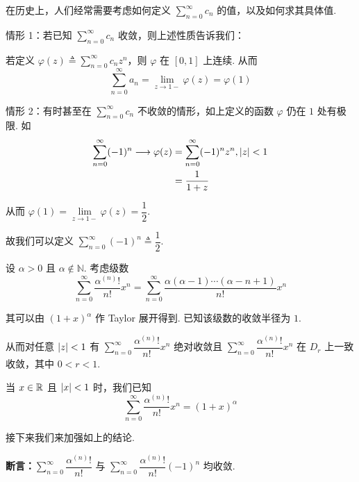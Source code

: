 \begin{example}[ Abel 求和]
    在历史上，人们经常需要考虑如何定义 $\sum\limits_{n=0}^\infty c_n$ 的值，以及如何求其具体值.

    情形 1：若已知 $\sum\limits_{n=0}^\infty c_n$ 收敛，则上述性质告诉我们：

    若定义 $\varphi(z)\triangleq\sum\limits_{n=0}^\infty c_nz^n$，则 $\varphi$ 在 $[0,1]$ 上连续. 从而
$$
\sum_{n=0}^\infty a_n=\lim_{z\to 1-}\varphi(z)=\varphi(1)
$$

    情形 2：有时甚至在 $\sum\limits_{n=0}^\infty c_n$ 不收敛的情形，如上定义的函数 $\varphi$ 仍在 $1$ 处有极限. 如
$$
\begin{aligned}
    \sum_{n=0}^\infty (-1)^n\longrightarrow \varphi(z)&=\sum_{n=0}^\infty (-1)^nz^n,\left\lvert{z}\right\rvert<1\\
    &=\frac{1}{1+z}
\end{aligned}
$$

    从而 $\varphi(1)=\lim\limits_{z\to 1-}\varphi(z)=\dfrac{1}{2}$.

    故我们可以定义 $\sum\limits_{n=0}^\infty(-1)^n\triangleq\dfrac{1}{2}$.
\end{example}

\begin{example}
    设 $\alpha>0$ 且 $\alpha\notin\mathbb{N}$. 考虑级数
$$
\sum_{n=0}^\infty\frac{\alpha^{(n)}!}{n!}x^n=\sum_{n=0}^\infty\frac{\alpha(\alpha-1)\cdots(\alpha-n+1)}{n!}x^n
$$

    其可以由 $(1+x)^\alpha$ 作 Taylor 展开得到. 已知该级数的收敛半径为 $1$.
    
    从而对任意 $\left\lvert{z}\right\rvert<1$ 有 $\sum\limits_{n=0}^\infty\dfrac{\alpha^{(n)}!}{n!}x^n$ 绝对收敛且 $\sum\limits_{n=0}^\infty\dfrac{\alpha^{(n)}!}{n!}x^n$ 在 $D_r$ 上一致收敛，其中 $0<r<1$.

    当 $x\in\mathbb{R}$ 且 $\left\lvert{x}\right\rvert<1$ 时，我们已知
$$
\sum_{n=0}^\infty\frac{\alpha^{(n)}!}{n!}x^n=(1+x)^\alpha
$$

    接下来我们来加强如上的结论.
\end{example}

\textbf{断言：}$\sum\limits_{n=0}^\infty\dfrac{\alpha^{(n)}!}{n!}$ 与 $\sum\limits_{n=0}^\infty\dfrac{\alpha^{(n)}!}{n!}(-1)^n$ 均收敛.

